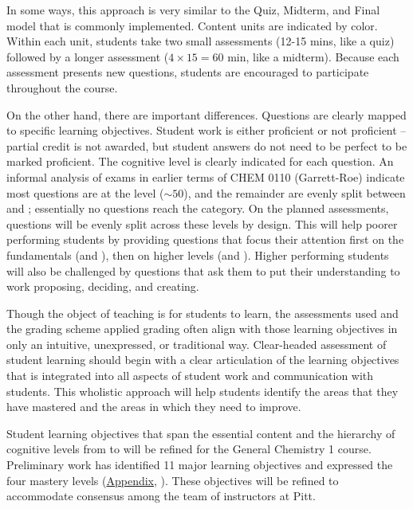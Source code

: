 \documentclass[10pt,letterpaper]{article}
\begin{document}
In some ways, this approach is very similar to the Quiz, Midterm, and Final model that is commonly implemented. Content units are indicated by color. Within each unit, students take two small assessments (12-15 mins, like a quiz) followed by a longer assessment ($4\times15=60$ min, like a midterm). Because each assessment presents new questions, students are encouraged to participate throughout the course.

On the other hand, there are important differences. Questions are clearly mapped to specific learning objectives. Student work is either proficient or not proficient -- partial credit is not awarded, but student answers do not need to be perfect to be marked proficient. The cognitive level is clearly indicated for each question. An informal analysis of exams in earlier terms of CHEM 0110 (Garrett-Roe) indicate most questions are at the \analysis level ($\sim50$), and the remainder are evenly split between \recall and \comprehension; essentially no questions reach the \use category. On the planned assessments, questions will be evenly split across these levels by design. This will help poorer performing students by providing questions that focus their attention first on the fundamentals (\recall and \comprehension), then on higher levels (\analysis and \use). Higher performing students will also be challenged by \use questions that ask them to put their understanding to work proposing, deciding, and creating.

%
%
Though the object of teaching is for students to learn,  the assessments used and the grading scheme applied grading often align with those learning objectives in only an intuitive, unexpressed, or traditional way. Clear-headed assessment of student learning should begin with a clear articulation of the learning objectives that is integrated into all aspects of student work and communication with students. This wholistic approach will help students identify the areas that they have mastered and the areas in which  they need to improve.

Student learning objectives that span the essential content and the hierarchy of cognitive levels from \recall to \use will be refined for the General Chemistry 1 course. Preliminary work has identified 11 major learning objectives and expressed the four mastery levels (\hyperref[app:learning_objectives]{Appendix}, ). These objectives will be refined to accommodate consensus among the team of \pogil instructors at Pitt. 
\end{document}
